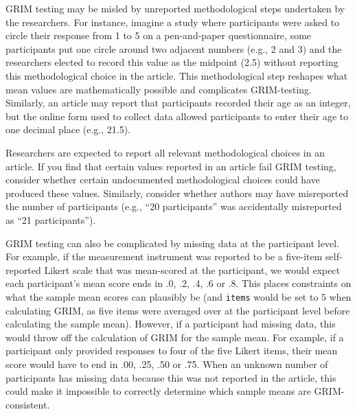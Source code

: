 \documentclass[letterpaper, 12pt]{article}
\begin{document}
GRIM testing may be misled by unreported methodological steps undertaken by the researchers. For instance, imagine a study where participants were asked to circle their response from 1 to 5 on a pen-and-paper questionnaire, some participants put one circle around two adjacent numbers (e.g., 2 and 3) and the researchers elected to record this value as the midpoint (2.5) without reporting this methodological choice in the article. This methodological step reshapes what mean values are mathematically possible and complicates GRIM-testing. Similarly, an article may report that participants recorded their age as an integer, but the online form used to collect data allowed participants to enter their age to one decimal place (e.g., 21.5). 

Researchers are expected to report all relevant methodological choices in an article. If you find that certain values reported in an article fail GRIM testing, consider whether certain undocumented methodological choices could have produced these values. Similarly, consider whether authors may have misreported the number of participants (e.g., ``20 participants'' was accidentally misreported as ``21 participants'').

GRIM testing can also be complicated by missing data at the participant level. For example, if the measurement instrument was reported to be a five-item self-reported Likert scale that was mean-scored at the participant, we would expect each participant's mean score ends in .0, .2, .4, .6 or .8. This places constraints on what the sample mean scores can plausibly be (and \texttt{items} would be set to 5 when calculating GRIM, as five items were averaged over at the participant level before calculating the sample mean). However, if a participant had missing data, this would throw off the calculation of GRIM for the sample mean. For example, if a participant only provided responses to four of the five Likert items, their mean score would have to end in .00, .25, .50 or .75. When an unknown number of participants has missing data because this was not reported in the article, this could make it impossible to correctly determine which sample means are GRIM-consistent.
\end{document}
